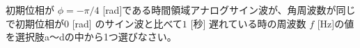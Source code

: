初期位相が $\phi=-\pi/4$ [rad]である時間領域アナログサイン波が、角周波数が同じで初期位相が$0$ [rad] のサイン波と比べて$1$ [秒] 遅れている時の周波数 $f$ [Hz]の値を選択肢a〜dの中から1つ選びなさい。
